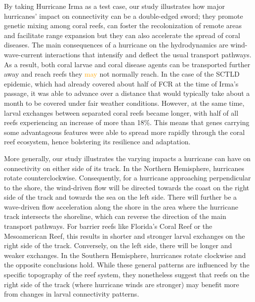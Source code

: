 \documentclass[fleqn,10pt]{wlscirep}
\newcommand{\modif}[1]{\textcolor{orange}{#1}}
\begin{document}
By taking Hurricane Irma as a test case, our study illustrates how major hurricanes' impact on connectivity can be a double-edged sword; they promote genetic mixing among coral reefs, can foster the recolonization of remote areas and facilitate range expansion but they can also accelerate the spread of coral diseases. The main consequences of a hurricane on the hydrodynamics are wind-wave-current interactions that intensify and deflect the usual transport pathways. As a result, both coral larvae and coral disease agents can be transported further away and reach reefs they \modif{may} not normally reach. In the case of the SCTLD epidemic, which had already covered about half of FCR at the time of Irma's passage, it was able to advance over a distance that would typically take about a month to be covered under fair weather conditions. However, at the same time, larval exchanges between separated coral reefs became longer, with half of all reefs experiencing an increase of more than 18\%. This means that genes carrying some advantageous features were able to spread more rapidly through the coral reef ecosystem, hence bolstering its resilience and adaptation.

More generally, our study illustrates the varying impacts a hurricane can have on connectivity on either side of its track. In the Northern Hemisphere, hurricanes rotate counterclockwise. Consequently, for a hurricane approaching perpendicular to the shore, the wind-driven flow will be directed towards the coast on the right side of the track and towards the sea on the left side. There will further be a wave-driven flow acceleration along the shore in the area where the hurricane track intersects the shoreline, which can reverse the direction of the main transport pathways. For barrier reefs like Florida's Coral Reef or the Mesoamerican Reef, this results in shorter and stronger larval exchanges on the right side of the track. Conversely, on the left side, there will be longer and weaker exchanges. In the Southern Hemisphere, hurricanes rotate clockwise and the opposite conclusions hold. While these general patterns are influenced by the specific topography of the reef system, they nonetheless suggest that reefs on the right side of the track (where hurricane winds are stronger) may benefit more from changes in larval connectivity patterns.
\end{document}
